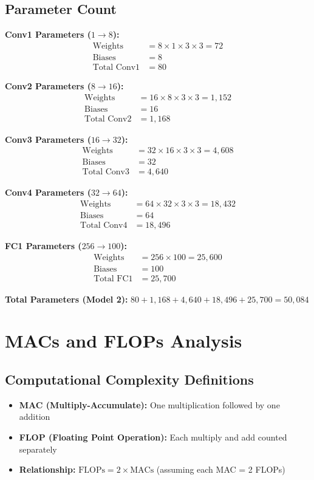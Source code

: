 \documentclass[11pt,a4paper]{article}
\begin{document}
\subsection{Parameter Count}

\textbf{Conv1 Parameters ($1 \to 8$):}
\begin{align*}
\text{Weights} &= 8 \times 1 \times 3 \times 3 = 72 \\
\text{Biases} &= 8 \\
\text{Total Conv1} &= 80
\end{align*}

\textbf{Conv2 Parameters ($8 \to 16$):}
\begin{align*}
\text{Weights} &= 16 \times 8 \times 3 \times 3 = 1,152 \\
\text{Biases} &= 16 \\
\text{Total Conv2} &= 1,168
\end{align*}

\textbf{Conv3 Parameters ($16 \to 32$):}
\begin{align*}
\text{Weights} &= 32 \times 16 \times 3 \times 3 = 4,608 \\
\text{Biases} &= 32 \\
\text{Total Conv3} &= 4,640
\end{align*}

\textbf{Conv4 Parameters ($32 \to 64$):}
\begin{align*}
\text{Weights} &= 64 \times 32 \times 3 \times 3 = 18,432 \\
\text{Biases} &= 64 \\
\text{Total Conv4} &= 18,496
\end{align*}

\textbf{FC1 Parameters ($256 \to 100$):}
\begin{align*}
\text{Weights} &= 256 \times 100 = 25,600 \\
\text{Biases} &= 100 \\
\text{Total FC1} &= 25,700
\end{align*}

\textbf{Total Parameters (Model 2):} $80 + 1,168 + 4,640 + 18,496 + 25,700 = \boxed{50,084}$

\section{MACs and FLOPs Analysis}

\subsection{Computational Complexity Definitions}
\begin{itemize}
    \item \textbf{MAC (Multiply-Accumulate):} One multiplication followed by one addition
    \item \textbf{FLOP (Floating Point Operation):} Each multiply and add counted separately
    \item \textbf{Relationship:} $\text{FLOPs} = 2 \times \text{MACs}$ (assuming each MAC = 2 FLOPs)
\end{itemize}
\end{document}
